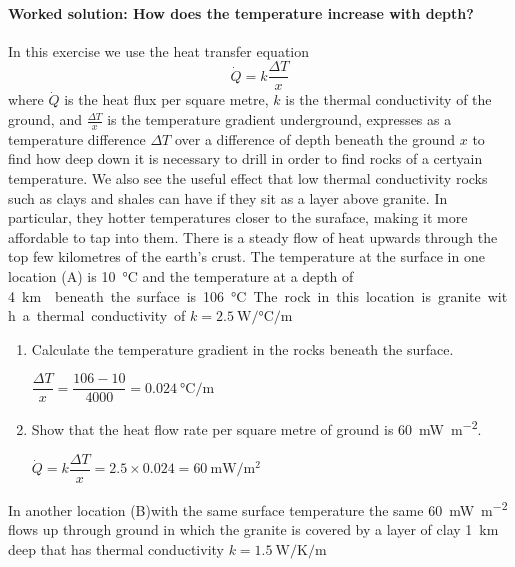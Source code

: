 \documentclass[a4paper,12pt,fleqn]{article}
\begin{document}
\paragraph{\textbf{Worked solution: How does the temperature increase with depth?}}
In this exercise we use the heat transfer equation\
\begin{equation}
\dot Q =k \dfrac{\Delta T}{x}
\end{equation}
where $\dot Q$ is the heat flux per square metre, $k$ is the thermal conductivity of the ground, and $\frac{\Delta T}{x}$ is the temperature gradient underground, expresses as a temperature difference $\Delta T$ over a difference of depth beneath the ground $x$ to find how deep down it is necessary to drill in order to find rocks of a certyain temperature. We also see the useful effect that low thermal conductivity rocks such as clays and shales can have if they sit as a layer above granite. In particular, they hotter temperatures closer to the suraface, making it more affordable to tap into them.
There is a steady flow of heat upwards through the top few kilometres of the earth's crust.  The temperature at the surface in one location (A) is \SI{10}{\celsius} and the temperature at a depth of \SI{4}\km{} beneath the surface is \SI{106}{\celsius}. The rock in this location is granite with a thermal conductivity of $k=\SI{2.5}{\watt\per\celsius\per\metre}$
\begin{enumerate}[label=\alph*)]
\item  Calculate the temperature gradient in the rocks beneath the surface.\par
$\dfrac{\Delta T}{x}=\dfrac{106-10}{4000}=\SI{0.024}{\celsius\per\metre}$
\item  Show that the heat flow rate per square metre of ground is \SI{60}{\milli\watt\per\metre\squared}.\par
$\dot Q=k\dfrac{\Delta T}{x}=2.5\times 0.024 = \SI{60}{\milli\watt\per\metre\squared}$
\end{enumerate}
In another location (B)with the same surface temperature the same \SI{60}{\milli\watt\per\metre\squared} flows up through ground in which the granite is covered by a layer of clay \SI{1}{\kilo\metre} deep that has thermal conductivity $k=\SI{1.5}{\watt\per\kelvin\per\metre}$
\end{document}
